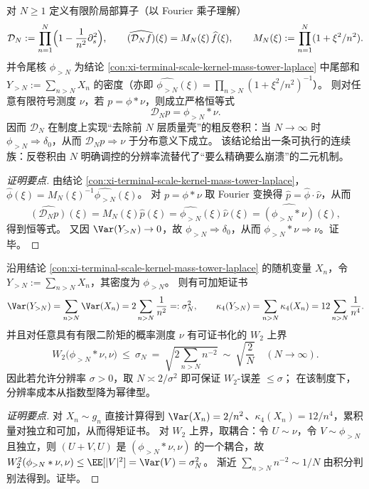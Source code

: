 \begin{conclusion}\label{con:xi-terminal-scale-kernel-partial-deconvolution-resolution}
对 \(N\ge 1\) 定义有限阶局部算子（以 Fourier 乘子理解）
\[
\mathcal D_N:=\prod_{n=1}^{N}\Bigl(1-\frac{1}{n^2}\partial_s^2\Bigr),
\qquad
\widehat{(\mathcal D_N f)}(\xi)=M_N(\xi)\,\widehat f(\xi),
\qquad
M_N(\xi):=\prod_{n=1}^{N}(1+\xi^{2}/n^{2}).
\]
并令尾核 \(\phi_{>N}\) 为结论 \ref{con:xi-terminal-scale-kernel-mass-tower-laplace} 中尾部和
\(
Y_{>N}:=\sum_{n>N}X_n
\)
的密度（亦即 \(\widehat{\phi_{>N}}(\xi)=\prod_{n>N}(1+\xi^{2}/n^{2})^{-1}\)）。
则对任意有限符号测度 \(\nu\)，若 \(p=\phi*\nu\)，则成立严格恒等式
\[
\boxed{\;
\mathcal D_N p=\phi_{>N}*\nu.\;}
\]
因而 \(\mathcal D_N\) 在制度上实现“去除前 \(N\) 层质量壳”的粗反卷积：当 \(N\to\infty\) 时 \(\phi_{>N}\Rightarrow\delta_0\)，从而 \(\mathcal D_N p\Rightarrow \nu\) 于分布意义下成立。
该结论给出一条可执行的连续族：反卷积由 \(N\) 明确调控的分辨率流替代了“要么精确要么崩溃”的二元机制。
\end{conclusion}
\begin{proof}[证明要点]
由结论 \ref{con:xi-terminal-scale-kernel-mass-tower-laplace}，\(\widehat\phi(\xi)=M_N(\xi)^{-1}\widehat{\phi_{>N}}(\xi)\)。
对 \(p=\phi*\nu\) 取 Fourier 变换得 \(\widehat p=\widehat\phi\cdot\widehat\nu\)，从而
\[
\widehat{(\mathcal D_N p)}(\xi)=M_N(\xi)\widehat p(\xi)=\widehat{\phi_{>N}}(\xi)\widehat\nu(\xi)=\widehat{(\phi_{>N}*\nu)}(\xi),
\]
得到恒等式。
又因 \(\Var(Y_{>N})\to 0\)，故 \(\phi_{>N}\Rightarrow\delta_0\)，从而 \(\phi_{>N}*\nu\Rightarrow\nu\)。证毕。
\end{proof}

\begin{conclusion}\label{con:xi-terminal-scale-kernel-tail-moments-w2}
沿用结论 \ref{con:xi-terminal-scale-kernel-mass-tower-laplace} 的随机变量 \(X_n\)，令 \(Y_{>N}:=\sum_{n>N}X_n\)，其密度为 \(\phi_{>N}\)。
则有可加矩证书
\[
\Var(Y_{>N})=\sum_{n>N}\Var(X_n)=2\sum_{n>N}\frac{1}{n^2}=: \sigma_N^2,
\qquad
\kappa_4(Y_{>N})=\sum_{n>N}\kappa_4(X_n)=12\sum_{n>N}\frac{1}{n^4}.
\]
并且对任意具有有限二阶矩的概率测度 \(\nu\) 有可证书化的 \(W_2\) 上界
\[
\boxed{\;
W_2\bigl(\phi_{>N}*\nu,\nu\bigr)\ \le\ \sigma_N
\ =\ \sqrt{2\sum_{n>N}n^{-2}}
\ \sim\ \sqrt{\frac{2}{N}}\quad(N\to\infty).\;}
\]
因此若允许分辨率 \(\sigma>0\)，取 \(N\asymp 2/\sigma^{2}\) 即可保证 \(W_2\)-误差 \(\le \sigma\)；
在该制度下，分辨率成本从指数型降为幂律型。
\end{conclusion}
\begin{proof}[证明要点]
对 \(X_n\sim g_n\) 直接计算得到 \(\Var(X_n)=2/n^2\)、\(\kappa_4(X_n)=12/n^4\)，累积量对独立和可加，从而得矩证书。
对 \(W_2\) 上界，取耦合：令 \(U\sim \nu\)，令 \(V\sim \phi_{>N}\) 且独立，则 \((U+V,U)\) 是 \((\phi_{>N}*\nu,\nu)\) 的一个耦合，故
\(
W_2^2(\phi_{>N}*\nu,\nu)\le \EE[|V|^2]=\Var(V)=\sigma_N^2
\)。
渐近 \(\sum_{n>N}n^{-2}\sim 1/N\) 由积分判别法得到。证毕。
\end{proof}

